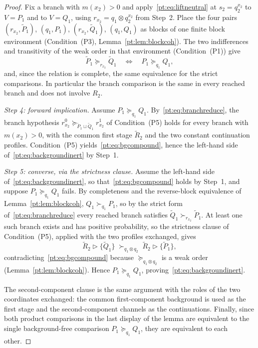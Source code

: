 \documentclass[11pt,a4paper]{article}
\theoremstyle{definition}
\newcommand{\1}{\mathbf 1}
\begin{document}
\begin{proof}
Fix a branch with $m(x_2)>0$ and apply~\eqref{pt:eq:liftneutral} at $s_2=q_2^{x_2}$ to $V=P_1$ and to $V=Q_1$, using
$r_{x_2}=q_1\otimes q_2^{x_2}$ from Step~2.  Place the four pairs
$(r_{x_2},\widetilde P_1)$, $(q_1,P_1)$, $(r_{x_2},\widetilde Q_1)$, $(q_1,Q_1)$ as blocks of one finite block environment
(Condition~\textup{(P3)}, Lemma~\ref{pt:lem:blockcoh}).  The two indifferences and transitivity of the weak order in that
environment (Condition~\textup{(P1)}) give
\begin{equation}
\widetilde P_1\succeq_{r_{x_2}}\widetilde Q_1
\quad\Longleftrightarrow\quad
P_1\succeq_{q_1}Q_1,
\tag{$\ddagger$}\label{pt:eq:branchreduce}
\end{equation}
and, since the relation is complete, the same equivalence for the strict comparisons.  In particular the branch
comparison is the same in every reached branch and does not involve $R_2$.

\emph{Step 4: forward implication.}
Assume $P_1\succeq_{q_1}Q_1$.  By~\eqref{pt:eq:branchreduce}, the branch hypothesis
$r_{x_2}^0\succeq_{\widetilde P_1\sqcup\widetilde Q_1}r_{x_2}^1$ of Condition~\textup{(P5)} holds for every branch with
$m(x_2)>0$, with the common first stage $\widetilde R_2$ and the two constant continuation profiles.
Condition~\textup{(P5)} yields~\eqref{pt:eq:bgcompound}, hence the left-hand side of~\eqref{pt:eq:backgroundinert} by Step~1.

\emph{Step 5: converse, via the strictness clause.}
Assume the left-hand side of~\eqref{pt:eq:backgroundinert}, so that~\eqref{pt:eq:bgcompound} holds by Step~1, and suppose
$P_1\succeq_{q_1}Q_1$ fails.  By completeness and the reverse-block equivalence of Lemma~\ref{pt:lem:blockcoh},
$Q_1\succ_{q_1}P_1$, so by the strict form of~\eqref{pt:eq:branchreduce} every reached branch satisfies
$\widetilde Q_1\succ_{r_{x_2}}\widetilde P_1$.  At least one such branch exists and has positive probability, so the
strictness clause of Condition~\textup{(P5)}, applied with the two profiles exchanged, gives
\[
\widetilde R_2\triangleright\{\widetilde Q_1\}
\;\succ_{q_1\otimes q_2}\;
\widetilde R_2\triangleright\{\widetilde P_1\},
\]
contradicting~\eqref{pt:eq:bgcompound} because $\succeq_{q_1\otimes q_2}$ is a weak order
(Lemma~\ref{pt:lem:blockcoh}).  Hence $P_1\succeq_{q_1}Q_1$, proving~\eqref{pt:eq:backgroundinert}.

The second-component clause is the same argument with the roles of the two coordinates exchanged: the common
first-component background is used as the first stage and the second-component channels as the continuations.  Finally,
since both product comparisons in the last display of the lemma are equivalent to the single background-free comparison
$P_1\succeq_{q_1}Q_1$, they are equivalent to each other.
\end{proof}
\end{document}
